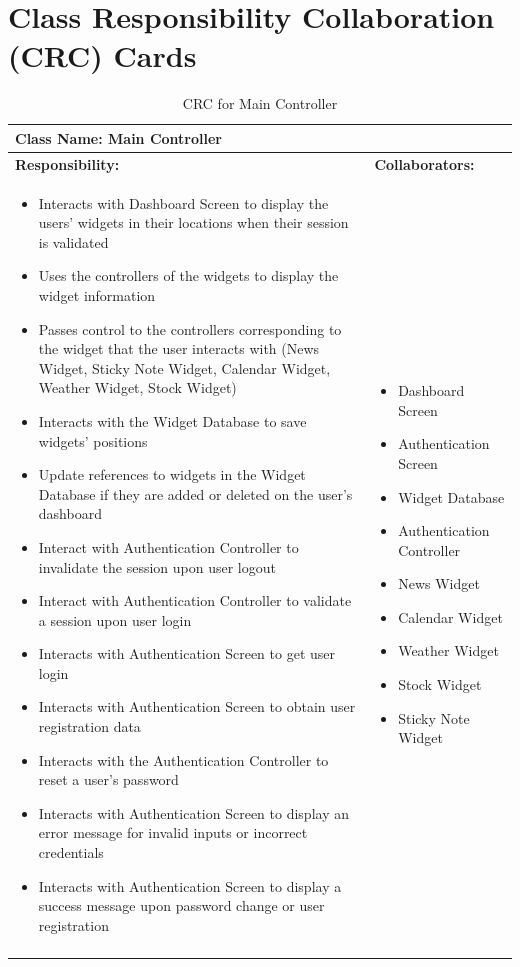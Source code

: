 \documentclass[]{article}
\begin{document}
\section{Class Responsibility Collaboration (CRC) Cards}
\label{sec:class_responsibility_collaboration_crc_cards}
\begin{longtable}{| p{} | p{} |}
	\hline
	\multicolumn{2}{|l|}{\textbf{Class Name: Main Controller}} \\
	\hline
	\textbf{Responsibility:} & \textbf{Collaborators:} \\
	\hline
	\begin{itemize}
	    \item Interacts with Dashboard Screen to display the users' widgets in their locations when their session is validated
	    \item Uses the controllers of the widgets to display the widget information
	    \item Passes control to the controllers corresponding to the widget that the user interacts with (News Widget, Sticky Note Widget, Calendar Widget, Weather Widget, Stock Widget)
	    \item Interacts with the Widget Database to save widgets' positions
	    \item Update references to widgets in the Widget Database if they are added or deleted on the user's dashboard
		\item Interact with Authentication Controller to invalidate the session upon user logout
		\item Interact with Authentication Controller to validate a session upon user login
		\item Interacts with Authentication Screen to get user login
		\item Interacts with Authentication Screen to obtain user registration data
		\item Interacts with the Authentication Controller to reset a user's password
		\item Interacts with Authentication Screen to display an error message for invalid inputs or incorrect credentials
		\item Interacts with Authentication Screen to display a success message upon password change or user registration
    \end{itemize} & 
	\begin{itemize}
		\item Dashboard Screen
        \item Authentication Screen
        \item Widget Database
        \item Authentication Controller
		\item News Widget
		\item Calendar Widget
		\item Weather Widget
		\item Stock Widget
		\item Sticky Note Widget
	\end{itemize} \\
	\hline
	\caption{CRC for Main Controller}
\end{longtable}
\end{document}
